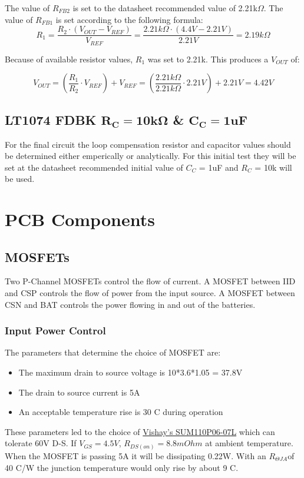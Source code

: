 \documentclass{article}
\begin{document}
The value of $R_{FB2}$ is set to the datasheet recommended value of 2.21k$\Omega$. The value of $R_{FB1}$ is set according to the following formula:
\[ R_1 = \frac{R_2 \cdot (V_{OUT} - V_{REF})}{V_{REF}} = \frac{2.21k\Omega \cdot (4.4V - 2.21V)}{2.21V} = 2.19k\Omega\]

Because of available resistor values, $R_1$ was set to 2.21k. This produces a $V_{OUT}$ of:

\[ V_{OUT} = \left ( \frac{R_1}{R_2} \cdot V_{REF} \right ) + V_{REF} =  \left ( \frac{2.21k\Omega}{2.21k\Omega} \cdot 2.21V \right ) + 2.21V  = 4.42V\]

\subsection{LT1074 FDBK $\mathbf{R_C=10k\Omega}$ \& $\mathbf{C_C=1uF}$}
For the final circuit the loop compensation resistor and capacitor values should be determined either emperically or analytically. For this initial test they will be set at the datasheet recommended initial value of $C_C$ = 1uF and $R_C$ = 10k will be used.
\section{PCB Components}

\subsection{MOSFETs}
Two P-Channel MOSFETs control the flow of current. A MOSFET between IID and CSP controls the flow of power from the input source. A MOSFET between CSN and BAT controls the power flowing in and out of the batteries. 

\subsubsection{Input Power Control}
The parameters that determine the choice of MOSFET are: 
\begin{itemize}
\item The maximum drain to source voltage is 10*3.6*1.05 = 37.8V
\item The drain to source current is 5A
\item An acceptable temperature rise is 30 C during operation
\end{itemize}
These parameters led to the choice of \href{http://www.vishay.com/docs/72439/72439.pdf}{Vishay's SUM110P06-07L} which can tolerate 60V D-S. If $V_{GS} = 4.5V$, $R_{DS(on)} = 8.8mOhm$ at ambient temperature. When the MOSFET is passing 5A it will be dissipating 0.22W. With an $R_{\Theta JA}$of 40 C/W the junction temperature would only rise by about 9 C.
\end{document}
